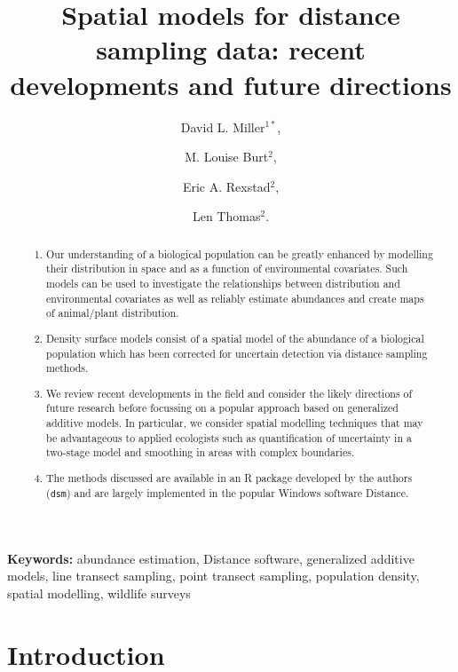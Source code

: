 \documentclass[a4paper,12pt]{article}
\title{Spatial models for distance sampling data: recent developments and future directions}
\author{
David L. Miller$^{1*}$, \and
M. Louise Burt$^{2}$, \and
Eric A. Rexstad$^{2}$, \and 
Len Thomas$^{2}$.}
\begin{document}
\maketitle

\begin{abstract}
  \noindent 

\begin{enumerate}
	\item Our understanding of a biological population can be greatly enhanced by modelling their distribution in space and as a function of environmental covariates. Such models can be used to investigate the relationships between distribution and environmental covariates as well as reliably estimate abundances and create maps of animal/plant distribution. 
	\item Density surface models consist of a spatial model of the abundance of a biological population which has been corrected for uncertain detection via distance sampling methods. 
	\item We review recent developments in the field and consider the likely directions of future research before focussing on a popular approach based on generalized additive models.  In particular, we consider spatial modelling techniques that may be advantageous to applied ecologists such as quantification of uncertainty in a two-stage model and smoothing in areas with complex boundaries.
	\item The methods discussed are available in an \textsf{R} package developed by the authors (\texttt{dsm}) and are largely implemented in the popular Windows software Distance.
\end{enumerate}
 

\end{abstract}

\noindent \textbf{Keywords:} abundance estimation, Distance software, generalized additive models, line transect sampling, point transect sampling, population density, spatial modelling, wildlife surveys


\newpage

\section*{Introduction}
\label{s:intro}
\end{document}
